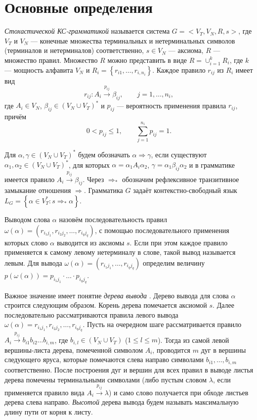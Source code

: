 \documentclass[12pt]{article}
\renewcommand{\leq}{\leqslant}
\begin{document}
\section{Основные определения}

\textit{Стохастической КС-грамматикой} \cite{fu-struct} называется система $G = <V_T, V_N, R, s>$, где $V_T$ и $V_N$ --- конечные множества терминальных и нетерминальных символов (терминалов и нетерминалов) соответственно, $s \in V_N$ --- аксиома, $R$ --- множество правил. Множество $R$ можно представить в виде $R = \cup_{i = 1}^k R_i$, где $k$ --- мощность алфавита $V_N$ и $R_i = \left\{r_{i1}, \ldots, r_{i,n_i}\right\}$. Каждое правило $r_{ij}$ из $R_i$ имеет вид
\begin{equation}
	r_{ij} : A_i \xrightarrow{p_{ij}} \beta_{ij},\qquad j = 1, \ldots, n_i,
\end{equation}
где $A_i \in V_N$, $\beta_{ij} \in (V_N \cup V_T)^*$ и $p_{ij}$ --- вероятность применения правила $r_{ij}$, причём
\begin{equation}
\label{eq:p_values}
	0 < p_{ij} \leq 1,\qquad \sum_{j = 1}^{n_i} p_{ij} = 1.
\end{equation}

Для $\alpha, \gamma \in (V_N \cup V_T)^*$ будем обозначать $\alpha \Rightarrow \gamma$, если существуют $\alpha_1, \alpha_2 \in (V_N \cup V_T)^*$, для которых $\alpha = \alpha_1 A_i \alpha_2$, $\gamma = \alpha_1 \beta_{ij} \alpha_2$ и в грамматике имеется правило $A_i \xrightarrow{p_{ij}} \beta_{ij}$. Через $\Rightarrow_*$ обозначим рефлексивное транзитивное замыкание отношения $\Rightarrow$. Грамматика $G$ задаёт контекстно-свободный язык $L_G = \left\{ \alpha \in V_T^* : s \Rightarrow_* \alpha\right\}$.

Выводом слова $\alpha$ назовём последовательность правил $\omega(\alpha) = (r_{i_1 j_1}, r_{i_2 j_2}, \ldots, r_{i_q j_q})$, с помощью последовательного применения которых слово $\alpha$ выводится из аксиомы $s$. Если при этом каждое правило применяется к самому левому нетерминалу в слове, такой вывод называется левым. Для вывода $\omega(\alpha) = (r_{i_1 j_1}, \ldots, r_{i_q j_q})$ определим величину $p(\omega(\alpha)) = p_{i_1 j_1} \cdot \ldots \cdot p_{i_q j_q}$.

Важное значение имеет понятие \textit{дерева вывода} \cite{aho-ulman-syntax}. Дерево вывода для слова $\alpha$ строится следующим образом. Корень дерева помечается аксиомой $s$. Далее последовательно рассматриваются правила левого вывода $\omega(\alpha) = r_{i_1 j_1}, r_{i_2 j_2}, \ldots, r_{i_q j_q}$. Пусть на очередном шаге рассматривается правило $A_i \xrightarrow{p_{ij}} b_{i1} b_{i2} \ldots b_{i,m}$, где $b_{i,l} \in (V_N \cup V_T)$ ($1 \leq l \leq m$). Тогда из самой левой вершины-листа дерева, помеченной символом $A_i$, проводится $m$ дуг в вершины следующего яруса, которые помечаются слева направо символами $b_{i1}, \ldots, b_{i,m}$ соответственно. После построения дуг и вершин для всех правил в выводе листья дерева помечены терминальными символами (либо пустым словом $\lambda$, если применяется правило вида $A_i \xrightarrow{p_{ij}} \lambda$) и само слово получается при обходе листьев дерева слева направо. \textit{Высотой} дерева вывода будем называть максимальную длину пути от корня к листу.
\end{document}
